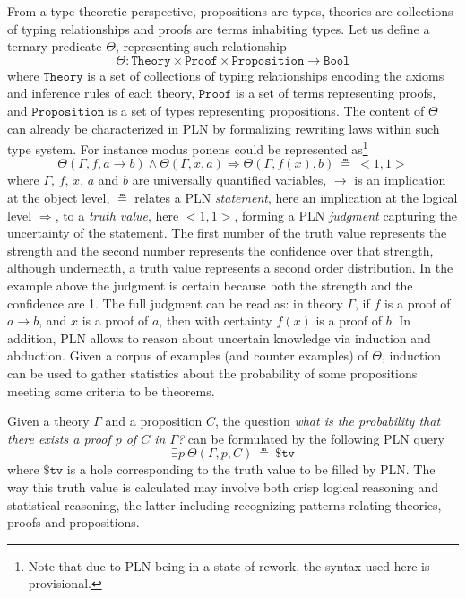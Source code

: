 \documentclass{easychair}
\newcommand{\U}{\Theta}
\newcommand{\Theory}{\texttt{Theory}}
\newcommand{\Proof}{\texttt{Proof}}
\newcommand{\Proposition}{\texttt{Proposition}}
\newcommand{\Bool}{\texttt{Bool}}
\newcommand{\arrow}{\to}
\newcommand{\limp}{\Rightarrow}
\newcommand{\True}{\texttt{True}}
\newcommand{\STV}[2]{<\!#1, #2\!>}
\begin{document}
From a type theoretic perspective, propositions are types, theories
are collections of typing relationships and proofs are terms
inhabiting types.  Let us define a ternary predicate $\U$,
representing such relationship
$$\U : \Theory \times \Proof \times \Proposition \arrow \Bool$$ where
$\Theory$ is a set of collections of typing relationships encoding the
axioms and inference rules of each theory, $\Proof$ is a set of terms
representing proofs, and $\Proposition$ is a set of types representing
propositions.  The content of $\U$ can already be characterized in PLN
by formalizing rewriting laws within such type system.  For instance
modus ponens could be represented as\footnote{Note that due to PLN
being in a state of rework, the syntax used here is provisional.}
$$\U(\Gamma, f, a \to b) \land \U(\Gamma, x, a) \limp \U(\Gamma, f(x),
b)\ \measeq\ \STV{1}{1}$$ where $\Gamma$, $f$, $x$, $a$ and $b$ are
universally quantified variables, $\to$ is an implication at the
object level, $\measeq$ relates a PLN \emph{statement}, here an
implication at the logical level $\limp$, to a \emph{truth value},
here $\STV{1}{1}$, forming a PLN \emph{judgment} capturing the
uncertainty of the statement.  The first number of the truth value
represents the strength and the second number represents the
confidence over that strength, although underneath, a truth value
represents a second order distribution.  In the example above the
judgment is certain because both the strength and the confidence are
1.  The full judgment can be read as: in theory $\Gamma$, if $f$ is a
proof of $a \arrow b$, and $x$ is a proof of $a$, then with certainty
$f(x)$ is a proof of $b$.  In addition, PLN allows to reason about
uncertain knowledge via induction and abduction.  Given a corpus of
examples (and counter examples) of $\Theta$, induction can be used to
gather statistics about the probability of some propositions meeting
some criteria to be theorems.

Given a theory $\Gamma$ and a proposition $C$, the question \emph{what
is the probability that there exists a proof $p$ of $C$ in $\Gamma$?}
can be formulated by the following PLN query
$$\exists p\ \U(\Gamma, p, C)\ \measeq\ \$\texttt{tv}$$ where
$\$\texttt{tv}$ is a hole corresponding to the truth value to be
filled by PLN.  The way this truth value is calculated may involve
both crisp logical reasoning and statistical reasoning, the latter
including recognizing patterns relating theories, proofs and
propositions.
\end{document}
